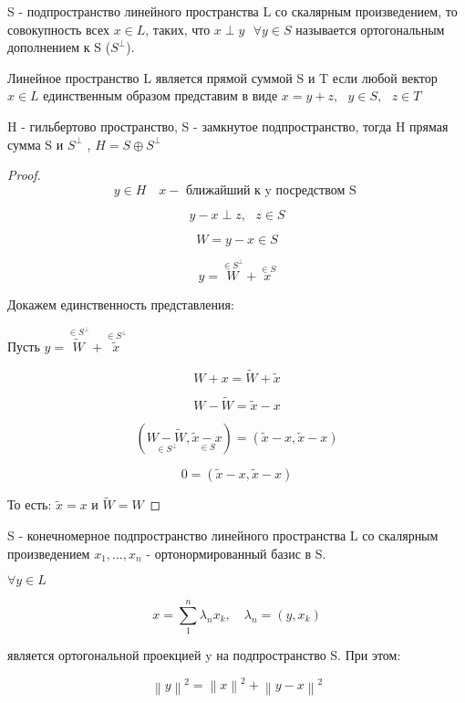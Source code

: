\documentclass[12pt, a4paper]{report}
\begin{document}
\begin{definition}
    S - подпространство линейного пространства L  со скалярным произведением, то совокупность всех \( x \in  L    \), таких, что \( x \perp y \text{ }  \forall  y \in S  \) называется ортогональным дополнением к S  (\( S^{\perp }  \)).
\end{definition}

\begin{definition}
    Линейное пространство L является прямой суммой S  и T если любой вектор \( x \in  L      \)  единственным образом представим в виде \( x = y + z , \text{ }  y \in  S , \text{  } z \in  T  \) 
\end{definition}

\begin{lemma}
    H - гильбертово пространство, S - замкнутое подпространство, тогда H  прямая сумма S  и \(  S^{\perp } \) , \( H =   S \oplus S^{\perp }   \) 
\end{lemma}

\begin{proof}
    
    \[  y \in  H \quad  x - \text{ ближайший к y посредством S }  \] 

    \[ y -x \perp  z , \text{ }  z \in  S  \] 

    \[ W = y -x \in  S  \]  

    \[ y = \overset{ \in  S ^{\perp } }{W} +\overset{\in  S }{ x}  \] 

    Докажем единственность представления: 

    Пусть \( y = \overset{ \in  S ^{\perp } }{\tilde{W }} + \overset{ \in  S ^{\perp } }{\tilde{ x }}  \) 

    \[  W + x = \tilde{ W } +\tilde{ x } \] 

    \[ W - \tilde{W } = \tilde{ x } - x  \] 

    \[ (\underset{\in  S ^{\perp }}{W- \tilde{W }}  , \underset{\in S}{ \tilde{ x } - x }) = (\tilde{x } -x , \tilde{x } - x ) \] 

    \[ 0 =  (\tilde{x } -x , \tilde{x } - x )\] 

    То есть: \( \tilde{x } = x  \text{ и }  \tilde{W } = W  \) 
\end{proof}

S - конечномерное подпространство линейного пространства L со скалярным произведением \( x_1, \ldots, x_n    \)  - ортонормированный базис в S. 

\begin{theorem}
    \( \forall  y \in  L     \) 

    \[ x = \sum_{1} ^n \lambda_n x_k , \quad  \lambda_n = (y , x_k) \] 

    является ортогональной проекцией y на подпространство S. При этом: 

    \[  \left\lVert  y  \right\rVert ^2 =\left\lVert  x  \right\rVert ^2 + \left\lVert  y -x   \right\rVert ^2  \] 
\end{theorem}
\end{document}
